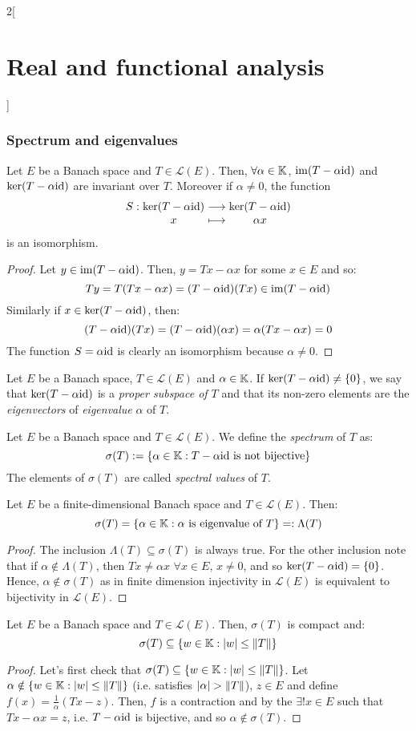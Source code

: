\documentclass[../../../main_math.tex]{subfiles}
\begin{document}
\begin{multicols}{2}[\section{Real and functional analysis}]
  \subsubsection{Spectrum and eigenvalues}
  \begin{proposition}
    Let $E$ be a Banach space and $T\in\mathcal{L}(E)$. Then, $\forall \alpha\in\mathbb{K}$, $\operatorname{im}(T-\alpha\mathrm{id})$ and $\ker(T-\alpha\mathrm{id})$ are invariant over $T$. Moreover if $\alpha\ne 0$, the function $$\function{S}{\ker(T-\alpha\id)}{\ker(T-\alpha\id)}{x}{\alpha x}$$ is an isomorphism.
  \end{proposition}
  \begin{proof}
    Let $y\in \operatorname{im}(T-\alpha \mathrm{id})$. Then, $y=Tx-\alpha x$ for some $x\in E$ and so: $$Ty=T(Tx-\alpha x)=(T-\alpha\mathrm{id})(Tx)\in\operatorname{im}(T-\alpha\mathrm{id})$$
    Similarly if $x\in\ker(T-\alpha\mathrm{id})$, then: $$(T-\alpha\mathrm{id})(Tx)=(T-\alpha\mathrm{id})(\alpha x)=\alpha(Tx-\alpha x)=0$$
    The function $S=\alpha \mathrm{id}$ is clearly an isomorphism because $\alpha\ne 0$.
  \end{proof}
  \begin{definition}
    Let $E$ be a Banach space, $T\in\mathcal{L}(E)$ and $\alpha\in \mathbb{K}$. If $\ker(T-\alpha\mathrm{id})\ne\{0\}$, we say that $\ker(T-\alpha\mathrm{id})$ is a \emph{proper subspace of $T$} and that its non-zero elements are the \emph{eigenvectors} of \emph{eigenvalue} $\alpha$ of $T$.
  \end{definition}
  \begin{definition}
    Let $E$ be a Banach space and $T\in\mathcal{L}(E)$. We define the \emph{spectrum} of $T$ as: $$\sigma(T):=\{\alpha\in\mathbb{K}:T-\alpha\mathrm{id}\text{ is not bijective}\}$$
    The elements of $\sigma(T)$ are called \emph{spectral values} of $T$.
  \end{definition}
  \begin{proposition}
    Let $E$ be a finite-dimensional Banach space and $T\in\mathcal{L}(E)$. Then: $$\sigma(T)=\{\alpha\in\mathbb{K}:\alpha\text{ is eigenvalue of }T\}=:\Lambda(T)$$
  \end{proposition}
  \begin{proof}
    The inclusion $\Lambda(T)\subseteq \sigma(T)$ is always true. For the other inclusion note that if $\alpha\notin \Lambda(T)$, then $Tx\ne \alpha x$ $\forall x\in E$, $x\ne 0$, and so $\ker (T-\alpha \mathrm{id})=\{0\}$. Hence, $\alpha\notin \sigma(T)$ as in finite dimension injectivity in $\mathcal{L}(E)$ is equivalent to bijectivity in $\mathcal{L}(E)$.
  \end{proof}
  \begin{proposition}
    Let $E$ be a Banach space and $T\in\mathcal{L}(E)$. Then, $\sigma(T)$ is compact and: $$\sigma(T)\subseteq\{w\in \mathbb{K}:\abs{w}\leq\left\|T\right\|\}$$
  \end{proposition}
  \begin{proof}
    Let's first check that $\sigma(T)\subseteq\{w\in \mathbb{K}:\abs{w}\leq\left\|T\right\|\}$. Let $\alpha\notin\{w\in \mathbb{K}:\abs{w}\leq\left\|T\right\|\}$ (i.e. satisfies $\abs{\alpha}>\left\|T\right\|$), $z\in E$ and define $f(x)=\frac{1}{\alpha} (Tx-z)$. Then, $f$ is a contraction and by the  $\exists!x\in E$ such that $Tx-\alpha x=z$, i.e. $T-\alpha\mathrm{id}$ is bijective, and so $\alpha\notin\sigma (T)$.


\end{proof}
\end{multicols}
\end{document}
